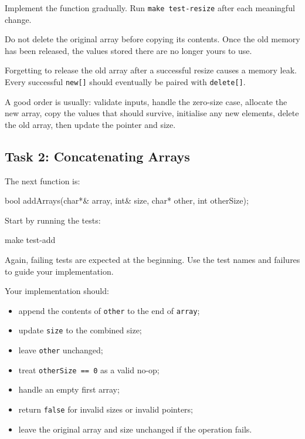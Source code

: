 \documentclass{csc2059practical}
\begin{document}
Implement the function gradually. Run \texttt{make test-resize} after each meaningful change.

\begin{commonerror}
Do not delete the original array before copying its contents. Once the old memory has been released, the values stored there are no longer yours to use.
\end{commonerror}

\begin{commonerror}
Forgetting to release the old array after a successful resize causes a memory leak. Every successful \texttt{new[]} should eventually be paired with \texttt{delete[]}.
\end{commonerror}

\begin{tipbox}
A good order is usually: validate inputs, handle the zero-size case, allocate the new array, copy the values that should survive, initialise any new elements, delete the old array, then update the pointer and size.
\end{tipbox}

\subsection*{Task 2: Concatenating Arrays}

The next function is:

\begin{cppcode}
bool addArrays(char*& array,
               int& size,
               char* other,
               int otherSize);
\end{cppcode}

Start by running the tests:

\begin{bashcode}
make test-add
\end{bashcode}

Again, failing tests are expected at the beginning. Use the test names and failures to guide your implementation.

Your implementation should:
\begin{itemize}
  \item append the contents of \texttt{other} to the end of \texttt{array};
  \item update \texttt{size} to the combined size;
  \item leave \texttt{other} unchanged;
  \item treat \texttt{otherSize == 0} as a valid no-op;
  \item handle an empty first array;
  \item return \texttt{false} for invalid sizes or invalid pointers;
  \item leave the original array and size unchanged if the operation fails.
\end{itemize}
\end{document}
